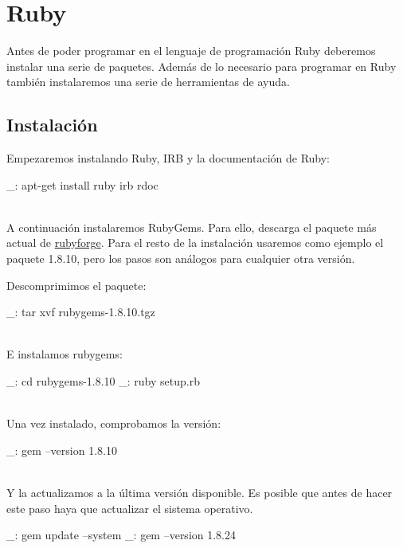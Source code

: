 \chapter{Ruby}
\label{comun:ruby}

Antes de poder programar en el lenguaje de programación Ruby deberemos instalar una serie de paquetes. Además de lo necesario para programar en Ruby también instalaremos una serie de herramientas de ayuda.


\section{Instalación}

Empezaremos instalando Ruby, IRB y la documentación de Ruby:

\begin{bashcode}
_: apt-get install ruby irb rdoc
\end{bashcode}
\\

A continuación instalaremos RubyGems. Para ello, descarga el paquete más actual de \href{http://rubyforge.org/frs/?group_id=126}{rubyforge}. Para el resto de la instalación usaremos como ejemplo el paquete 1.8.10, pero los pasos son análogos para cualquier otra versión.

Descomprimimos el paquete:

\begin{bashcode}
_: tar xvf rubygems-1.8.10.tgz
\end{bashcode}
\\

E instalamos rubygems:

\begin{bashcode}
_: cd rubygems-1.8.10
_: ruby setup.rb
\end{bashcode}
\\

Una vez instalado, comprobamos la versión:

\begin{bashcode}
_: gem --version
1.8.10
\end{bashcode}
\\

Y la actualizamos a la última versión disponible. Es posible que antes de hacer este paso haya que actualizar el sistema operativo.

\begin{bashcode}
_: gem update --system
_: gem --version
1.8.24
\end{bashcode}
\\

